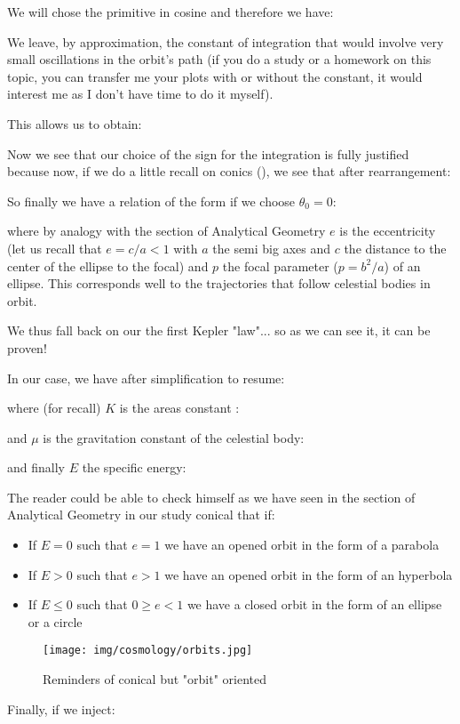 	We will chose the primitive in cosine and therefore we have:
	
	We leave, by approximation, the constant of integration that would involve very small oscillations in the orbit's path (if you do a study or a homework on this topic, you can transfer me your plots with or without the constant, it would interest me as I don't  have time to do it myself).

	This allows us to obtain:
	
	Now we see that our choice of the sign for the integration is fully justified because now, if we do a little recall on conics (), we see that after rearrangement:
	
	So finally we have a relation of the form if we choose $\theta_0=0$:
	
	where by analogy with the section of Analytical Geometry $e$ is the eccentricity (let us recall that $e=c/a<1$ with $a$ the semi big axes and $c$ the distance to the center of the ellipse to the focal) and $p$ the focal parameter ($p=b^2/a$) of an ellipse. This corresponds well to the trajectories that follow celestial bodies in orbit.
	
	We thus fall back on our the first  Kepler "law"... so as we can see it, it can be proven!

	In our case, we have after simplification to resume:
	
	where (for recall) $K$ is the areas constant :
	
	and $\mu$ is the gravitation constant of the celestial body:
	
	and finally $E$ the specific energy:
	
	The reader could be able to check himself as we have seen in the section of Analytical Geometry in our study conical that if:
	\begin{itemize}
		\item If $E=0$ such that $e=1$ we have an opened orbit in the form of a parabola

		\item If $E>0$ such that $e>1$ we have an opened orbit in the form of an hyperbola

		\item If $E\leq 0$ such that $0\geq e <1$ we have a closed orbit in the form of an ellipse or a circle
	\end{itemize}
	\begin{figure}[H]
		\begin{center}
		\texttt{[image: img/cosmology/orbits.jpg]}
		\end{center}	
		\caption[]{Reminders of conical but "orbit" oriented}
	\end{figure}
	Finally, if we inject:
	
